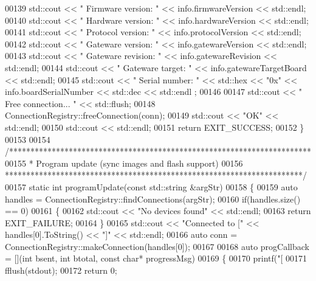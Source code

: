 \begin{DoxyCode}
00139     std::cout << \textcolor{stringliteral}{"  Firmware version: "} << info.firmwareVersion << std::endl;
00140     std::cout << \textcolor{stringliteral}{"  Hardware version: "} << info.hardwareVersion << std::endl;
00141     std::cout << \textcolor{stringliteral}{"  Protocol version: "} << info.protocolVersion << std::endl;
00142     std::cout << \textcolor{stringliteral}{"  Gateware version: "} << info.gatewareVersion << std::endl;
00143     std::cout << \textcolor{stringliteral}{"  Gateware revision: "} << info.gatewareRevision << std::endl;
00144     std::cout << \textcolor{stringliteral}{"  Gateware target: "} << info.gatewareTargetBoard << std::endl;
00145     std::cout << \textcolor{stringliteral}{"  Serial number: "} << std::hex << \textcolor{stringliteral}{"0x"} << info.boardSerialNumber << std::dec << std::endl
      ;
00146 
00147     std::cout << \textcolor{stringliteral}{"  Free connection... "} << std::flush;
00148     ConnectionRegistry::freeConnection(conn);
00149     std::cout << \textcolor{stringliteral}{"OK"} << std::endl;
00150     std::cout << std::endl;
00151     \textcolor{keywordflow}{return} EXIT\_SUCCESS;
00152 \}
00153 
00154 \textcolor{comment}{/***********************************************************************}
00155 \textcolor{comment}{ * Program update (sync images and flash support)}
00156 \textcolor{comment}{ **********************************************************************/}
00157 \textcolor{keyword}{static} \textcolor{keywordtype}{int} programUpdate(\textcolor{keyword}{const} std::string &argStr)
00158 \{
00159     \textcolor{keyword}{auto} handles = ConnectionRegistry::findConnections(argStr);
00160     \textcolor{keywordflow}{if}(handles.size() == 0)
00161     \{
00162         std::cout << \textcolor{stringliteral}{"No devices found"} << std::endl;
00163         \textcolor{keywordflow}{return} EXIT\_FAILURE;
00164     \}
00165     std::cout << \textcolor{stringliteral}{"Connected to ["} << handles[0].ToString() << \textcolor{stringliteral}{"]"} << std::endl;
00166     \textcolor{keyword}{auto} conn = ConnectionRegistry::makeConnection(handles[0]);
00167 
00168     \textcolor{keyword}{auto} progCallback = [](\textcolor{keywordtype}{int} bsent, \textcolor{keywordtype}{int} btotal, \textcolor{keyword}{const} \textcolor{keywordtype}{char}* progressMsg)
00169     \{
00170         printf(\textcolor{stringliteral}{"[%
00171         fflush(stdout);
00172         \textcolor{keywordflow}{return} 0;
}
\end{DoxyCode}
